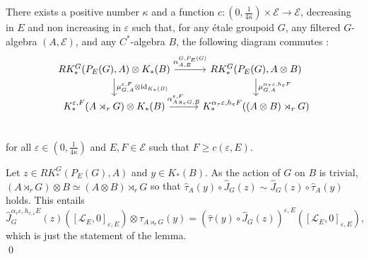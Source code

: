 \begin{lem}\label{KunnethLemma}
There exists a positive number $\kappa$ and a function $c : (0,\frac{1}{4\kappa})\times\mathcal E\rightarrow \mathcal E$, decreasing in $E$ and non increasing in $\varepsilon$ such that, for any étale groupoid $G$, any filtered $G$-algebra $(A,\mathcal E)$, and any $C^*$-algebra $B$, the following diagram commutes :
\[\begin{tikzcd}
RK_*^G(P_E(G),A)\otimes K_*(B) \arrow{r}{\alpha^{G,P_E(G)}_{A,B}}\arrow{d}{\mu_{G,A}^{\varepsilon,F}\otimes \text{id}_{K_*(B)}} & 
RK_*^G(P_E(G),A\otimes B) \arrow{d}{\mu_{G,A}^{\alpha_ \tau\varepsilon,h_\varepsilon F}} \\
K_*^{\varepsilon,F}(A\rtimes_r G)\otimes K_*(B) \arrow{r}{\alpha_{A\rtimes_r G,B}^{\varepsilon,F}} & 
K_*^{\alpha_\tau\varepsilon,h_{\varepsilon}F}((A\otimes B)\rtimes_r G)\\
\end{tikzcd}\] 
for all $\varepsilon\in(0,\frac{1}{4\kappa})$ and $E,F\in\mathcal E$ such that $F\geq c(\varepsilon,E)$. 
\end{lem}

\begin{dem}
Let $z\in RK_*^G(P_E(G),A)$ and $y\in K_*(B)$. As the action of $G$ on $B$ is trivial, $(A\rtimes_r G)\otimes B\simeq (A\otimes B)\rtimes_r G$ so that $\hat\tau_A(y)\circ \hat J_{G}(z) \sim \hat J_{G}(z)\circ \hat\tau_A(y) $ holds. This entails
\[\hat J_G^{\alpha_\tau\varepsilon, h_{\tau,\varepsilon}E}(z)\left([\mathcal L_E,0]_{\varepsilon, E} \right)\otimes \tau_{A\rtimes_r G}(y) = 
\left( \hat\tau(y)\circ \hat J_G(z) \right)^{\varepsilon, E}\left([\mathcal L_E,0]_{\varepsilon, E}\right),\]
which is just the statement of the lemma.\\
\qed
\end{dem}


